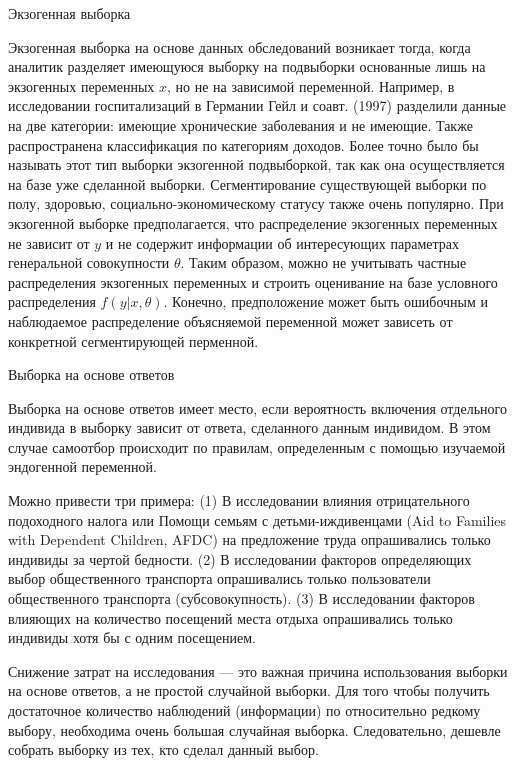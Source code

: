 \begin{center}
Экзогенная выборка
\end{center}


Экзогенная выборка на основе данных обследований возникает тогда, когда аналитик разделяет имеющуюся выборку на подвыборки основанные лишь на  экзогенных переменных $x$, но не на зависимой переменной. Например, в исследовании госпитализаций в Германии Гейл и соавт. (1997) разделили данные на две категории: имеющие хронические заболевания и не имеющие. 
Также распространена классификация по категориям доходов. 
Более точно было бы называть этот тип выборки экзогенной подвыборкой, так как она осуществляется на базе уже сделанной выборки.
Сегментирование существующей выборки по полу, здоровью, социально-экономическому статусу также очень популярно. 
При экзогенной выборке предполагается, что распределение  экзогенных переменных не зависит от $y$ и не содержит информации об интересующих параметрах генеральной совокупности $\theta$. Таким образом, можно не учитывать частные распределения экзогенных переменных и строить оценивание на базе условного распределения $f(y|x,\theta)$. Конечно, предположение может быть ошибочным и наблюдаемое распределение объясняемой переменной может зависеть от конкретной сегментирующей перменной. 


\begin{center}
Выборка на основе ответов
\end{center}

Выборка на основе ответов имеет место, если вероятность включения отдельного индивида в выборку зависит от ответа,  сделанного данным индивидом. В этом случае самоотбор происходит по правилам, определенным с помощью изучаемой эндогенной переменной.


Можно привести три примера: (1) В исследовании влияния отрицательного подоходного налога или Помощи семьям с детьми-иждивенцами (Aid to Families with Dependent Children, AFDC) на предложение труда опрашивались только индивиды за чертой бедности. (2) В исследовании факторов  определяющих выбор общественного транспорта опрашивались только пользователи  общественного транспорта (субсовокупность). (3) В исследовании факторов влияющих на количество посещений места отдыха опрашивались только индивиды хотя бы с одним посещением.


Снижение затрат на исследования --- это важная причина использования выборки на основе ответов, а не  простой случайной выборки. Для того чтобы получить достаточное количество наблюдений (информации) по относительно редкому выбору,  необходима очень большая случайная выборка. Следовательно, дешевле собрать выборку из тех, кто сделал данный выбор.


